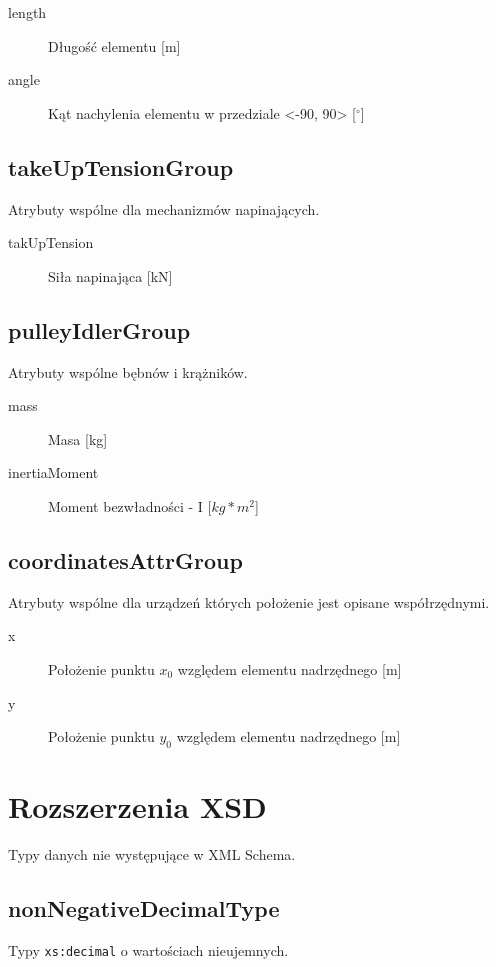 \documentclass[12pt,a4paper]{article}
\begin{document}
\begin{description}
\item[length] Długość elementu [m]
\item[angle] Kąt nachylenia elementu w przedziale <-90, 90> [$^\circ$] 
\end{description}

\subsection{takeUpTensionGroup}
Atrybuty wspólne dla mechanizmów napinających.

\begin{description}
\item[takUpTension] Siła napinająca [kN]
\end{description}

\subsection{pulleyIdlerGroup}
Atrybuty wspólne bębnów i krążników.

\begin{description}
\item[mass] Masa [kg]
\item[inertiaMoment] Moment bezwładności - I [$kg*m^2$]
\end{description}

\subsection{coordinatesAttrGroup}
Atrybuty wspólne dla urządzeń których położenie jest opisane współrzędnymi.

\begin{description}
\item[x] Położenie punktu $x_0$ względem elementu nadrzędnego [m]
\item[y] Położenie punktu $y_0$ względem elementu nadrzędnego [m]
\end{description}

\section{Rozszerzenia XSD}
Typy danych nie występujące w XML Schema.

\subsection{nonNegativeDecimalType}
Typy {\tt xs:decimal} o wartościach nieujemnych.
\end{document}
